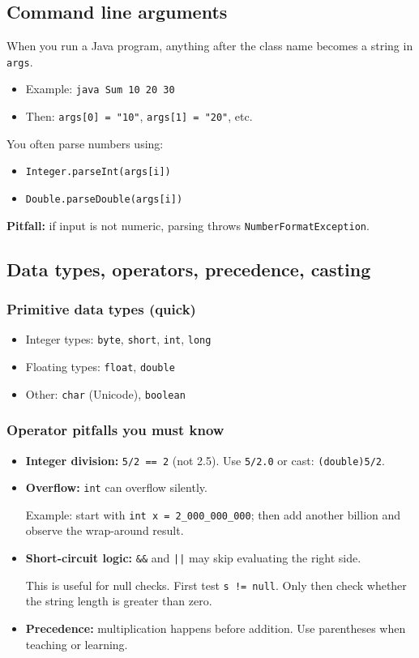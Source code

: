 \documentclass[11pt]{article}
\begin{document}
\subsection{Command line arguments}
When you run a Java program, anything after the class name becomes a string in \texttt{args}.
\begin{itemize}
  \item Example: \texttt{java Sum 10 20 30}
  \item Then: \texttt{args[0] = "10"}, \texttt{args[1] = "20"}, etc.
\end{itemize}
You often parse numbers using:
\begin{itemize}
  \item \texttt{Integer.parseInt(args[i])}
  \item \texttt{Double.parseDouble(args[i])}
\end{itemize}
\textbf{Pitfall:} if input is not numeric, parsing throws \texttt{NumberFormatException}.

\subsection{Data types, operators, precedence, casting}
\subsubsection{Primitive data types (quick)}
\begin{itemize}
  \item Integer types: \texttt{byte}, \texttt{short}, \texttt{int}, \texttt{long}
  \item Floating types: \texttt{float}, \texttt{double}
  \item Other: \texttt{char} (Unicode), \texttt{boolean}
\end{itemize}

\subsubsection{Operator pitfalls you must know}
\begin{itemize}
  \item \textbf{Integer division:} \texttt{5/2 == 2} (not 2.5). Use \texttt{5/2.0} or cast: \texttt{(double)5/2}.
  \item \textbf{Overflow:} \texttt{int} can overflow silently.\par
  Example: start with \texttt{int x = 2\_000\_000\_000}; then add another billion and observe the wrap-around result.
  \item \textbf{Short-circuit logic:} \texttt{\&\&} and \texttt{||} may skip evaluating the right side.\par
  This is useful for null checks. First test \texttt{s != null}. Only then check whether the string length is greater than zero.
  \item \textbf{Precedence:} multiplication happens before addition. Use parentheses when teaching or learning.
\end{itemize}
\end{document}
